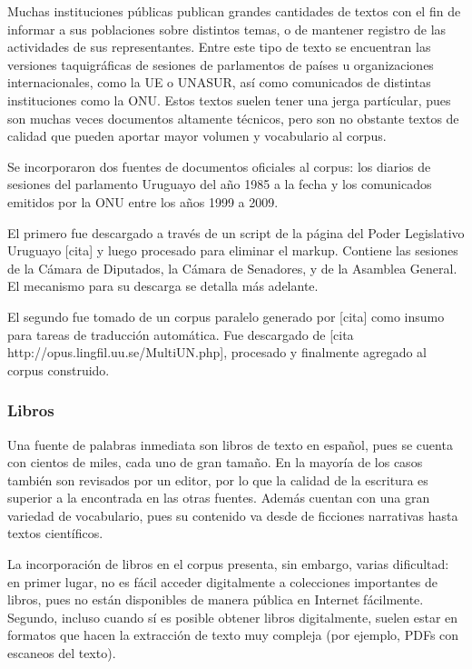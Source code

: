 Muchas instituciones públicas publican grandes cantidades de textos con el fin de informar a sus
poblaciones sobre distintos temas, o de mantener registro de las actividades de sus
representantes. Entre este tipo de texto se encuentran las versiones taquigráficas de sesiones de
parlamentos de países u organizaciones internacionales, como la UE o UNASUR, así como comunicados de
distintas instituciones como la ONU\@. Estos textos suelen tener una jerga partícular, pues son
muchas veces documentos altamente técnicos, pero son no obstante textos de calidad que pueden
aportar mayor volumen y vocabulario al corpus.

Se incorporaron dos fuentes de documentos oficiales al corpus: los diarios de sesiones del
parlamento Uruguayo del año 1985 a la fecha y los comunicados emitidos por la ONU entre los años
1999 a 2009.

El primero fue descargado a través de un script de la página del Poder Legislativo Uruguayo [cita] y
luego procesado para eliminar el markup. Contiene las sesiones de la Cámara de Diputados, la Cámara
de Senadores, y de la Asamblea General. El mecanismo para su descarga se detalla más adelante.

El segundo fue tomado de un corpus paralelo generado por [cita] como insumo para tareas de
traducción automática. Fue descargado de [cita http://opus.lingfil.uu.se/MultiUN.php], procesado y
finalmente agregado al corpus construido.


\subsubsection{Libros}

Una fuente de palabras inmediata son libros de texto en español, pues se cuenta con cientos de
miles, cada uno de gran tamaño. En la mayoría de los casos también son revisados por un editor, por
lo que la calidad de la escritura es superior a la encontrada en las otras fuentes. Además cuentan
con una gran variedad de vocabulario, pues su contenido va desde de ficciones narrativas hasta
textos científicos.

La incorporación de libros en el corpus presenta, sin embargo, varias dificultad: en primer lugar,
no es fácil acceder digitalmente a colecciones importantes de libros, pues no están disponibles de
manera pública en Internet fácilmente. Segundo, incluso cuando sí es posible obtener libros
digitalmente, suelen estar en formatos que hacen la extracción de texto muy compleja (por ejemplo,
PDFs con escaneos del texto).

